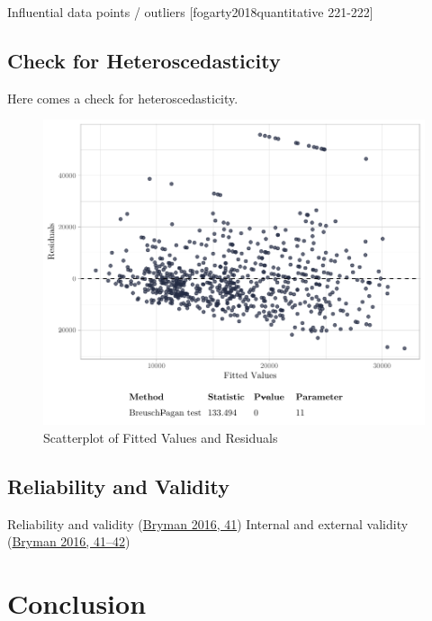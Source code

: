 \documentclass[
]{article}
\begin{document}
Influential data points / outliers {[}fogarty2018quantitative 221-222{]}

\hypertarget{check-for-heteroscedasticity}{%
\subsection{Check for
Heteroscedasticity}\label{check-for-heteroscedasticity}}

Here comes a check for heteroscedasticity.

\begin{figure}[H]

{\centering \includegraphics[width=0.8\linewidth]{paper_files/figure-latex/unnamed-chunk-4-1} 

}

\caption{Scatterplot of Fitted Values and Residuals}\label{fig:unnamed-chunk-4}
\end{figure}

\hypertarget{reliability-and-validity}{%
\subsection{Reliability and Validity}\label{reliability-and-validity}}

Reliability and validity
(\protect\hyperlink{ref-bryman2016social}{Bryman 2016, 41}) Internal and
external validity (\protect\hyperlink{ref-bryman2016social}{Bryman 2016,
41--42})

\hypertarget{conclusion}{%
\section{Conclusion}\label{conclusion}}

\pagebreak
\end{document}
